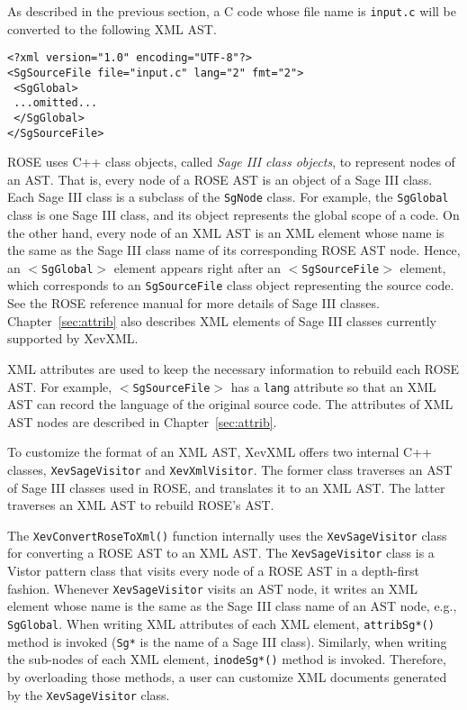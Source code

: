As described in the previous section, a C code whose file name is
\texttt{input.c} will be converted to the following XML AST.
\vspace{5mm}
\begin{verbatim}
<?xml version="1.0" encoding="UTF-8"?>
<SgSourceFile file="input.c" lang="2" fmt="2">
 <SgGlobal>
 ...omitted...
 </SgGlobal>
</SgSourceFile>
\end{verbatim}
\vspace{5mm}
ROSE uses C++ class objects, called \emph{Sage III class objects}, to
represent nodes of an AST.  That is, every node of a ROSE AST is an
object of a Sage III class. Each Sage III class is a subclass of the
\texttt{SgNode} class.  For example, the \texttt{SgGlobal} class is one
Sage III class, and its object represents the global scope of a code.
On the other hand, every node of an XML AST is an XML element whose name
is the same as the Sage III class name of its corresponding ROSE AST
node.  Hence, an \texttt{$<$SgGlobal$>$} element appears right after an
\texttt{$<$SgSourceFile$>$} element, which corresponds to an
\texttt{SgSourceFile} class object representing the source code.  See
the ROSE reference manual\cite{rosemanual} for more details of Sage III
classes. Chapter~\ref{sec:attrib} also describes XML elements of Sage
III classes currently supported by XevXML.

XML attributes are used to keep the necessary information to rebuild
each ROSE AST. For example, \texttt{$<$SgSourceFile$>$} has a
\texttt{lang} attribute so that an XML AST can record the language of
the original source code.  The attributes of XML AST nodes are described
in Chapter~\ref{sec:attrib}.

To customize the format of an XML AST, XevXML offers two internal C++
classes, \texttt{XevSageVisitor} and \texttt{XevXmlVisitor}.  The former
class traverses an AST of Sage III classes used in ROSE, and translates
it to an XML AST.  The latter traverses an XML AST to rebuild ROSE's
AST.

The \texttt{XevConvertRoseToXml()} function internally uses the
\texttt{XevSageVisitor} class for converting a ROSE AST to an XML AST.
The \texttt{XevSageVisitor} class is a Vistor pattern class that visits
every node of a ROSE AST in a depth-first fashion. Whenever
\texttt{XevSageVisitor} visits an AST node, it writes an XML element
whose name is the same as the Sage III class name of an AST node, e.g.,
\texttt{SgGlobal}.  When writing XML attributes of each XML element,
\texttt{attribSg*()} method is invoked (\texttt{Sg*} is the name of a
Sage III class). Similarly, when writing the sub-nodes of each XML
element, \texttt{inodeSg*()} method is invoked.  Therefore, by
overloading those methods, a user can customize XML documents generated
by the \texttt{XevSageVisitor} class.

